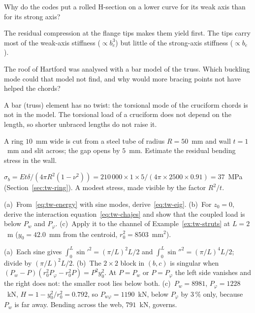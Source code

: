 \label{exo:tw-weak}
%
Why do the codes put a rolled H-section on a lower curve for its weak axis than for its strong axis?
\begin{solution}
The residual compression at the flange tips makes them yield first. The tips carry most of the weak-axis
stiffness ($\propto b_e^3$) but little of the strong-axis stiffness ($\propto b_e$).
\end{solution}

\label{exo:tw-hartford}
%
The roof of Hartford was analysed with a bar model of the truss. Which buckling mode could that model not
find, and why would more bracing points not have helped the chords?
\begin{solution}
A bar (truss) element has no twist: the torsional mode of the cruciform chords is not in the model. The
torsional load of a cruciform does not depend on the length, so shorter unbraced lengths do not raise it.
\end{solution}

\label{exo:tw-ring}
%
A ring $10$~mm wide is cut from a steel tube of radius $R = 50$~mm and wall $t = 1$~mm and slit across; the gap
opens by $5$~mm. Estimate the residual bending stress in the wall.
\begin{solution}
$\sigma_b = Et\delta/(4\pi R^2(1 - \nu^2)) = 210\,000\times1\times5/(4\pi\times2500\times0.91) = 37$~MPa (Section~\ref{sec:tw-ring}).
A modest stress, made visible by the factor $R^2/t$.
\end{solution}


\label{exo:tw-three}
%
(a)~From~\eqref{eq:tw-energy} with sine modes, derive~\eqref{eq:tw-eig}. (b)~For $z_0 = 0$, derive the interaction
equation~\eqref{eq:tw-chajes} and show that the coupled load is below $P_w$ and $P_\varphi$. (c)~Apply it to the channel
of Example~\ref{ex:tw-struts} at $L = 2$~m ($y_0 = 42.0$~mm from the centroid, $r_0^2 = 8503$~mm$^2$).
\begin{solution}
(a)~Each sine gives $\displaystyle\int_0^L\sin'^2 = (\pi/L)^2L/2$ and $\displaystyle\int_0^L\sin''^2 = (\pi/L)^4L/2$; divide by
$(\pi/L)^2L/2$. (b)~The $2\times2$ block in $(b, c)$ is singular when $(P_w - P)(r_0^2P_\varphi - r_0^2P) = P^2y_0^2$.
At $P = P_w$ or $P = P_\varphi$ the left side vanishes and the right does not: the smaller root lies below both.
(c)~$P_w = 8981$, $P_\varphi = 1228$~kN, $H = 1 - y_0^2/r_0^2 = 0.792$, so $P_{w\varphi} = 1190$~kN, below $P_\varphi$ by
$3\,\%$ only, because $P_w$ is far away. Bending across the web, $791$~kN, governs.

\end{solution}

